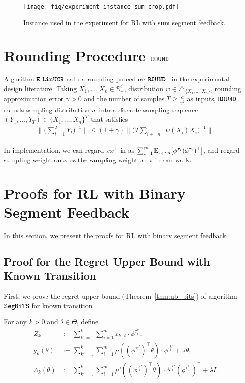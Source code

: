 \begin{figure}[h]
	\centering   
	\texttt{[image: fig/experiment\_instance\_sum\_crop.pdf]} \label{fig:lb_instance_sum}
	\caption{Instance used in the experiment for RL with sum segment feedback.
	}
\end{figure}


\section{Rounding Procedure $\mathtt{ROUND}$} \label{apx:rounding_procedure}

Algorithm $\mathtt{E\mbox{-}LinUCB}$ calls a rounding procedure $\mathtt{ROUND}$~\cite{allen2021near} in the experimental design literature. Taking $X_1,\dots,X_n \in \mathbb{S}^d_{+}$, distribution $w \in \triangle_{\{X_1,\dots,X_n\}}$, rounding approximation error $\gamma>0$ and the number of samples $T \geq \frac{d}{\gamma^2}$ as inputs, $\mathtt{ROUND}$ rounds sampling distribution $w$ into a discrete sampling sequence $(Y_1,\dots,Y_T) \in \{X_1,\dots,X_n\}^T$ that satisfies
\begin{align*}
	\Bigg\| \Bigg( \sum_{t=1}^{T}  Y_t \Bigg)^{-1} \Bigg\| 
	\leq (1+\gamma) \Bigg\| \Bigg( T \sum_{i \in [n]} w(X_i) X_i \Bigg)^{-1} \Bigg\| .
\end{align*}

In implementation, we can regard $x x^\top$ in \cite{allen2021near} as $\sum_{i=1}^{m} \mathbb{E}_{\tau_i \sim \pi} [\phi^{\tau_i} (\phi^{\tau_i})^\top]$, and regard sampling weight on $x$ as the sampling weight on $\pi$ in our work.

\section{Proofs for RL with Binary Segment Feedback}

In this section, we present the proofs for RL with binary segment feedback.

\subsection{Proof for the Regret Upper Bound with Known Transition}\label{apx:ub_binary_known_tran}

First, we prove the regret upper bound (Theorem~\ref{thm:ub_bits}) of algorithm $\mathtt{SegBiTS}$ for known transition.

	For any $k>0$ and $\theta \in \Theta$, define
\begin{align}
	Z_k &:= \sum_{k'=1}^{k} \sum_{i=1}^{m} \varepsilon_{k',i} \cdot \phi^{\tau^{k'}_i} , \nonumber
	\\
	g_{k}(\theta) &:= \sum_{k'=1}^{k} \sum_{i=1}^{m} \mu( (\phi^{\tau^{k'}_i})^\top\theta ) \cdot \phi^{\tau^{k'}_i} + \lambda \theta , \label{eq:def_g_k}
	\\
	\Lambda_{k}(\theta) &:=  \sum_{k'=1}^{k} \sum_{i=1}^{m} \mu'( (\phi^{\tau^{k'}_i})^\top\theta ) \cdot \phi^{\tau^{k'}_i} (\phi^{\tau^{k'}_i})^\top + \lambda I . \label{eq:def_Lambda_k}
\end{align}



